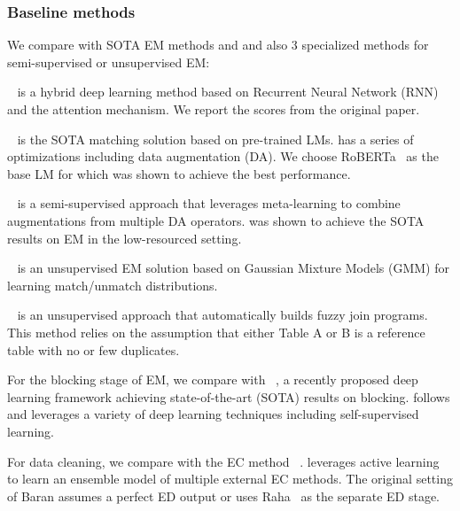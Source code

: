 \subsubsection{Baseline methods}





We compare \system with 
SOTA EM methods \dm and \ditto and also 3 specialized methods for semi-supervised
or unsupervised EM:

\smallskip
\noindent
\textbf{\dm}~\cite{DBLP:conf/sigmod/MudgalLRDPKDAR18} is a hybrid deep learning method based on
Recurrent Neural Network (RNN) and the attention mechanism. We report the scores from the original paper.

\smallskip
\noindent
\textbf{\ditto}~\cite{ditto2021} is the SOTA matching solution based on pre-trained LMs.
\ditto has a series of optimizations including data augmentation (DA).
We choose RoBERTa~\cite{DBLP:journals/corr/abs-1907-11692} as the base LM for \ditto which was shown to achieve the best performance.











\smallskip
\noindent
\textbf{\rot}~\cite{DBLP:conf/sigmod/Miao0021} is a semi-supervised approach that leverages
meta-learning to combine augmentations from multiple DA operators. \rot was shown to achieve the
SOTA results on EM in the low-resourced setting. 

\smallskip
\noindent
\textbf{\zeroer}~\cite{DBLP:conf/sigmod/WuCSCT20} is an unsupervised EM solution based on
Gaussian Mixture Models (GMM) for learning match/unmatch distributions.

\smallskip
\noindent
\textbf{\autofj}~\cite{DBLP:conf/sigmod/LiCCHC21} is an unsupervised approach that
automatically builds fuzzy join programs. This method relies on the assumption that
either Table A or B is a reference table with no or few duplicates.

For the blocking stage of EM, we compare \system with \textbf{\dbl}~\cite{DBLP:journals/pvldb/ThirumuruganathanLTOGPFD21}, 
a recently proposed deep learning framework achieving state-of-the-art (SOTA) results on blocking. \dbl follows \dm and leverages
a variety of deep learning techniques including self-supervised learning.


For data cleaning, we compare \system with the EC method
\textbf{\baran}~\cite{DBLP:journals/pvldb/MahdaviA20}. 
\baran leverages active learning to learn an ensemble model of multiple external EC methods.
The original setting of Baran assumes a perfect ED output or uses Raha~\cite{DBLP:conf/sigmod/MahdaviAFMOS019}
as the separate ED stage. 


